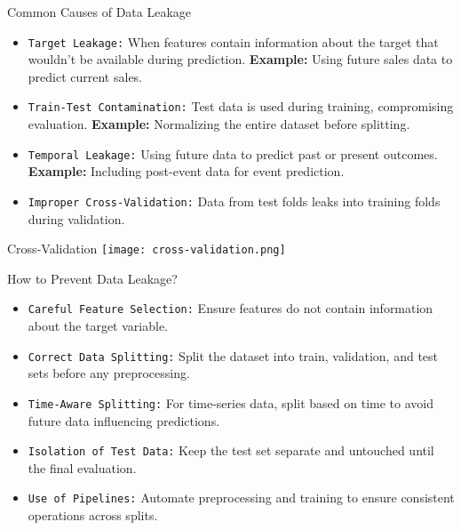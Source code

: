 \documentclass[serif, aspectratio=169]{beamer}
\begin{document}
\begin{frame}{Common Causes of Data Leakage}
    \begin{itemize}
        \item \texttt{\color{teal}Target Leakage:} When features contain information about the target that wouldn’t be available during prediction.  
        \textbf{Example:} Using future sales data to predict current sales.

        \item \texttt{\color{teal}Train-Test Contamination:} Test data is used during training, compromising evaluation.  
        \textbf{Example:} Normalizing the entire dataset before splitting.

        \item \texttt{\color{teal}Temporal Leakage:} Using future data to predict past or present outcomes.  
        \textbf{Example:} Including post-event data for event prediction.

        \item \texttt{\color{teal}Improper Cross-Validation:} Data from test folds leaks into training folds during validation.
    \end{itemize}
\end{frame}

\begin{frame}{Cross-Validation}
   \centering
   \texttt{[image: cross-validation.png]}
\end{frame}

\begin{frame}{How to Prevent Data Leakage?}
    \begin{itemize}
        \item \texttt{\color{teal}Careful Feature Selection:} 
        Ensure features do not contain information about the target variable.

        \item \texttt{\color{teal}Correct Data Splitting:} 
        Split the dataset into train, validation, and test sets before any preprocessing.

        \item \texttt{\color{teal}Time-Aware Splitting:} 
        For time-series data, split based on time to avoid future data influencing predictions.

        \item \texttt{\color{teal}Isolation of Test Data:} 
        Keep the test set separate and untouched until the final evaluation.

        \item \texttt{\color{teal}Use of Pipelines:} 
        Automate preprocessing and training to ensure consistent operations across splits.
    \end{itemize}
\end{frame}
\end{document}

